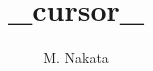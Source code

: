 \documentclass{naughieLuatex}
\title{{{_cursor_}}}
\author[*]{M. Nakata}
\affil[*]{Department of Science, Kyoto University}
\date{}
\begin{document}
\prepend
\end{document}
